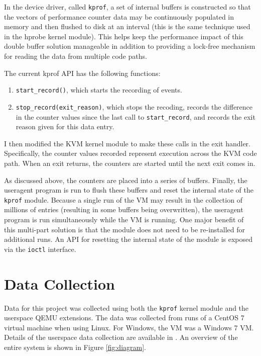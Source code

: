 \documentclass[notitlepage]{article}
\begin{document}
In the device driver, called \texttt{kprof}, a set of internal buffers is
constructed so that the vectors of performance counter data may be continuously
populated in memory and then flushed to disk at an interval (this is the same
technique used in the hprobe kernel module).  This helps keep the performance
impact of this double buffer solution manageable in addition to providing a
lock-free mechanism for reading the data from multiple code paths.

The current kprof API has the following functions:
\begin{enumerate}
    \item{\texttt{start\_record()}, which starts the recording of events.}
    \item{\texttt{stop\_record(exit\_reason)}, which stops the recoding, records
        the difference in the counter values since the last call to
    \texttt{start\_record}, and records the exit reason given for this data
entry.}
\end{enumerate}

I then modified the KVM kernel module to make these calls in the exit handler.
Specifically, the counter values recorded represent execution across the KVM
code path. When an exit returns, the counters are started until the next exit
comes in.

As discussed above, the counters are placed into a series of buffers. Finally,
the useragent program is run to flush these buffers and reset the internal state
of the \texttt{kprof} module. Because a single run of the VM may result in the
collection of millions of entries (resulting in some buffers being overwritten),
the useragent program is run simultaneously while the VM is running. One major
benefit of this multi-part solution is that the module does not need to be
re-installed for additional runs. An API for resetting the internal state of the
module is exposed via the \texttt{ioctl} interface.


\section{Data Collection}
\label{sec:data}
Data for this project was collected using both the \texttt{kprof} kernel module
and the userspace QEMU extensions. The data was collected from runs of a CentOS
7 virtual machine when using Linux. For Windows, the VM was a Windows 7 VM.
Details of the userspace data collection are available in \cite{f14}. An
overview of the entire system is shown in Figure \ref{fig:diagram}.
\end{document}
